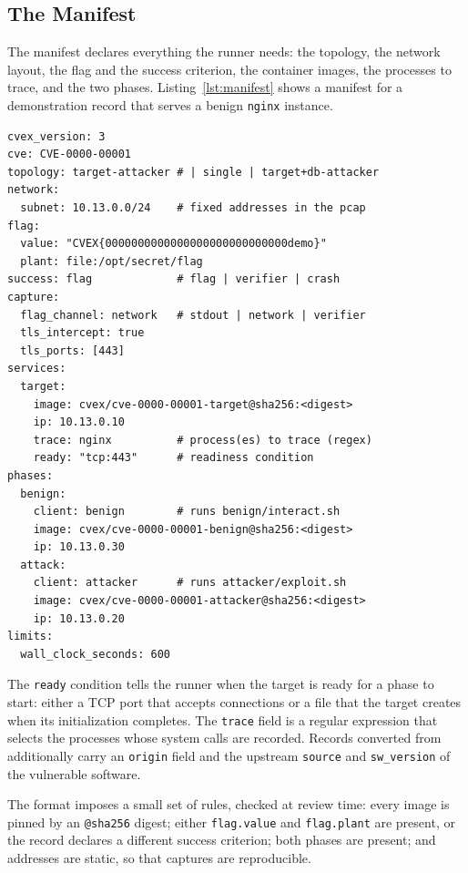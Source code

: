 \subsection{The Manifest}

The  manifest declares everything the runner needs: the
topology, the network layout, the flag and the success criterion, the
container images, the processes to trace, and the two phases.
Listing~\ref{lst:manifest} shows a manifest for a demonstration record that
serves a benign \texttt{nginx} instance.

\begin{lstlisting}[float=t,caption={A \file{cvex.yml} manifest (demonstration record).},label={lst:manifest}]
cvex_version: 3
cve: CVE-0000-00001
topology: target-attacker # | single | target+db-attacker
network:
  subnet: 10.13.0.0/24    # fixed addresses in the pcap
flag:
  value: "CVEX{0000000000000000000000000000demo}"
  plant: file:/opt/secret/flag
success: flag             # flag | verifier | crash
capture:
  flag_channel: network   # stdout | network | verifier
  tls_intercept: true
  tls_ports: [443]
services:
  target:
    image: cvex/cve-0000-00001-target@sha256:<digest>
    ip: 10.13.0.10
    trace: nginx          # process(es) to trace (regex)
    ready: "tcp:443"      # readiness condition
phases:
  benign:
    client: benign        # runs benign/interact.sh
    image: cvex/cve-0000-00001-benign@sha256:<digest>
    ip: 10.13.0.30
  attack:
    client: attacker      # runs attacker/exploit.sh
    image: cvex/cve-0000-00001-attacker@sha256:<digest>
    ip: 10.13.0.20
limits:
  wall_clock_seconds: 600
\end{lstlisting}

The \texttt{ready} condition tells the runner when the target is ready for a
phase to start: either a TCP port that accepts connections or a file that the
target creates when its initialization completes. The \texttt{trace} field is
a regular expression that selects the processes whose system calls are
recorded. Records converted from \genie additionally carry an
\texttt{origin} field and the upstream \texttt{source} and
\texttt{sw\_version} of the vulnerable software.

The format imposes a small set of rules, checked at review time: every image
is pinned by an \texttt{@sha256} digest; either \texttt{flag.value} and
\texttt{flag.plant} are present, or the record declares a different success
criterion; both phases are present; and addresses are static, so that
captures are reproducible.

